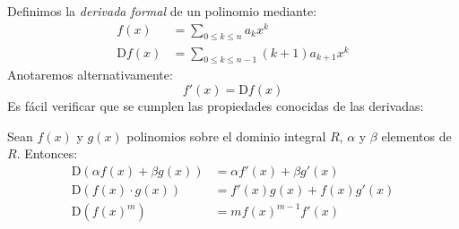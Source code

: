   Definimos la \emph{derivada formal}%
  de un polinomio mediante:
  \begin{align*}
    f(x)
      &= \sum_{0 \le k \le n} a_k x^k \\
    \mathrm{D} f(x)
      &= \sum_{0 \le k \le n - 1} (k + 1 ) a_{k + 1} x^k
  \end{align*}
  Anotaremos alternativamente:
  \begin{equation*}
    f'(x)
      = \mathrm{D} f(x)
  \end{equation*}
  Es fácil verificar que se cumplen las propiedades conocidas
  de las derivadas:
  \begin{theorem}
    \label{theo:polynomial-derivative}
    Sean \(f(x)\) y \(g(x)\) polinomios
    sobre el dominio integral \(R\),
    \(\alpha\) y \(\beta\) elementos de \(R\).
    Entonces:
    \begin{align*}
      \mathrm{D} (\alpha f(x) + \beta g(x))
	&= \alpha f'(x) + \beta g'(x) \\
      \mathrm{D} (f(x) \cdot g(x))
	&= f'(x) g(x) + f(x) g'(x) \\
      \mathrm{D} (f(x)^m)
	&= m f(x)^{m - 1} f'(x)
    \end{align*}
  \end{theorem}

